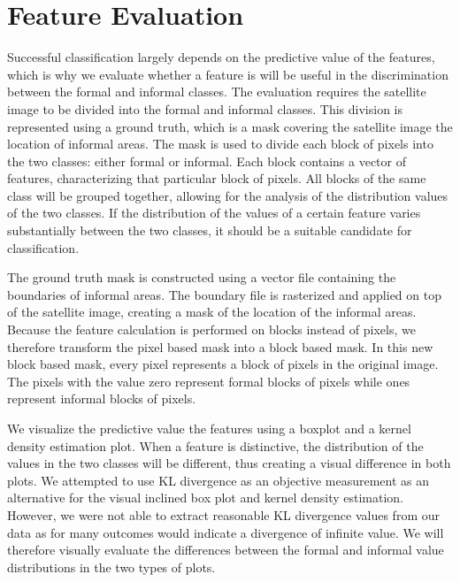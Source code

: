 
\section{Feature Evaluation}

Successful classification largely depends on the predictive value of the features, which is why we evaluate whether a feature is will be useful in the discrimination between the formal and informal classes. The evaluation requires the satellite image to be divided into the formal and informal classes. This division is represented using a ground truth, which is a mask covering the satellite image the location of informal areas. The mask is used to divide each block of pixels into the two classes: either formal or informal. Each block contains a vector of features, characterizing that particular block of pixels. All blocks of the same class will be grouped together, allowing for the analysis of the distribution values of the two classes. If the distribution of the values of a certain feature varies substantially between the two classes, it should be a suitable candidate for classification.

The ground truth mask is constructed using a vector file containing the boundaries of informal areas. The boundary file is rasterized and applied on top of the satellite image, creating a mask of the location of the informal areas. Because the feature calculation is performed on blocks instead of pixels, we therefore transform the pixel based mask into a block based mask. In this new block based mask, every pixel represents a block of pixels in the original image. The pixels with the value zero represent formal blocks of pixels while ones represent informal blocks of pixels.

We visualize the predictive value the features using a boxplot and a kernel density estimation plot. When a feature is distinctive, the distribution of the values in the two classes will be different, thus creating a visual difference in both plots. We attempted to use KL divergence as an objective measurement as an alternative for the visual inclined box plot and kernel density estimation. However, we were not able to extract reasonable KL divergence values from our data as for many outcomes would indicate a divergence of infinite value. We will therefore visually evaluate the differences between the formal and informal value distributions in the two types of plots.

